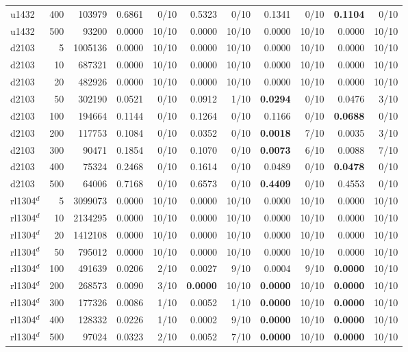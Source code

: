 \begin{tabular}{lrrrrrrrrrr}
u1432 & 400 & 103979 & 0.6861 & 0/10 & 0.5323 & 0/10 & 0.1341 & 0/10 & \textbf{0.1104} & 0/10 \\
u1432 & 500 & 93200 & 0.0000 & 10/10 & 0.0000 & 10/10 & 0.0000 & 10/10 & 0.0000 & 10/10 \\
\addlinespace[2pt]
d2103 & 5 & 1005136 & 0.0000 & 10/10 & 0.0000 & 10/10 & 0.0000 & 10/10 & 0.0000 & 10/10 \\
d2103 & 10 & 687321 & 0.0000 & 10/10 & 0.0000 & 10/10 & 0.0000 & 10/10 & 0.0000 & 10/10 \\
d2103 & 20 & 482926 & 0.0000 & 10/10 & 0.0000 & 10/10 & 0.0000 & 10/10 & 0.0000 & 10/10 \\
d2103 & 50 & 302190 & 0.0521 & 0/10 & 0.0912 & 1/10 & \textbf{0.0294} & 0/10 & 0.0476 & 3/10 \\
d2103 & 100 & 194664 & 0.1144 & 0/10 & 0.1264 & 0/10 & 0.1166 & 0/10 & \textbf{0.0688} & 0/10 \\
d2103 & 200 & 117753 & 0.1084 & 0/10 & 0.0352 & 0/10 & \textbf{0.0018} & 7/10 & 0.0035 & 3/10 \\
d2103 & 300 & 90471 & 0.1854 & 0/10 & 0.1070 & 0/10 & \textbf{0.0073} & 6/10 & 0.0088 & 7/10 \\
d2103 & 400 & 75324 & 0.2468 & 0/10 & 0.1614 & 0/10 & 0.0489 & 0/10 & \textbf{0.0478} & 0/10 \\
d2103 & 500 & 64006 & 0.7168 & 0/10 & 0.6573 & 0/10 & \textbf{0.4409} & 0/10 & 0.4553 & 0/10 \\
\addlinespace[2pt]
rl1304$^{d}$ & 5 & 3099073 & 0.0000 & 10/10 & 0.0000 & 10/10 & 0.0000 & 10/10 & 0.0000 & 10/10 \\
rl1304$^{d}$ & 10 & 2134295 & 0.0000 & 10/10 & 0.0000 & 10/10 & 0.0000 & 10/10 & 0.0000 & 10/10 \\
rl1304$^{d}$ & 20 & 1412108 & 0.0000 & 10/10 & 0.0000 & 10/10 & 0.0000 & 10/10 & 0.0000 & 10/10 \\
rl1304$^{d}$ & 50 & 795012 & 0.0000 & 10/10 & 0.0000 & 10/10 & 0.0000 & 10/10 & 0.0000 & 10/10 \\
rl1304$^{d}$ & 100 & 491639 & 0.0206 & 2/10 & 0.0027 & 9/10 & 0.0004 & 9/10 & \textbf{0.0000} & 10/10 \\
rl1304$^{d}$ & 200 & 268573 & 0.0090 & 3/10 & \textbf{0.0000} & 10/10 & \textbf{0.0000} & 10/10 & \textbf{0.0000} & 10/10 \\
rl1304$^{d}$ & 300 & 177326 & 0.0086 & 1/10 & 0.0052 & 1/10 & \textbf{0.0000} & 10/10 & \textbf{0.0000} & 10/10 \\
rl1304$^{d}$ & 400 & 128332 & 0.0226 & 1/10 & 0.0002 & 9/10 & \textbf{0.0000} & 10/10 & \textbf{0.0000} & 10/10 \\
rl1304$^{d}$ & 500 & 97024 & 0.0323 & 2/10 & 0.0052 & 7/10 & \textbf{0.0000} & 10/10 & \textbf{0.0000} & 10/10 \\
\bottomrule
\end{tabular}